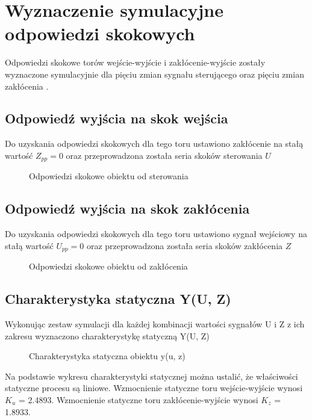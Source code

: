 \section{Wyznaczenie symulacyjne odpowiedzi skokowych}
\label{projekt:zad2}

Odpowiedzi skokowe torów wejście-wyjście i zakłócenie-wyjście zostały wyznaczone
symulacyjnie dla pięciu zmian sygnału sterującego oraz pięciu zmian zakłócenia .

\subsection{Odpowiedź wyjścia na skok wejścia}
\label{projekt:zad2:StepYU}

Do uzyskania odpowiedzi skokowych dla tego toru ustawiono zakłócenie na stałą
wartość $Z_{pp}=0$ oraz przeprowadzona została seria skoków sterowania $U$ 

\begin{figure}[H] 
    \centering
    
    \caption{Odpowiedzi skokowe obiektu od sterowania}
    \label{projekt:zad2:StepYU:figure}
\end{figure}
\newpage

\subsection{Odpowiedź wyjścia na skok zakłócenia}
\label{projekt:zad2:StepYZ}

Do uzyskania odpowiedzi skokowych dla tego toru ustawiono sygnał wejściowy na stałą
wartość $U_{pp}=0$ oraz przeprowadzona została seria skoków zakłócenia $Z$ 

\begin{figure}[H] 
    \centering
    
    \caption{Odpowiedzi skokowe obiektu od zakłócenia}
    \label{projekt:zad2:StepYZ:figure}
\end{figure}
\newpage

\subsection{Charakterystyka statyczna Y(U, Z)}
\label{projekt:zad2:charStat}

Wykonując zestaw symulacji dla każdej kombinacji wartości sygnałów U i Z z ich zakresu \newline 
wyznaczono charakterystykę statyczną Y(U, Z)

\begin{figure}[H] 
    \centering
    
    \caption{Charakterystyka statyczna obiektu y(u, z)}
    \label{projekt:zad2:charStat:figure}
\end{figure}

Na podstawie wykresu charakterystyki statycznej można ustalić, że właściwości
statyczne procesu są liniowe. \newline
Wzmocnienie statyczne toru wejście-wyjście wynosi  $K_{u}$ = \num{2,4893}. \newline
Wzmocnienie statyczne toru zakłócenie-wyjście wynosi  $K_{z}$ = \num{1,8933}.

\newpage
